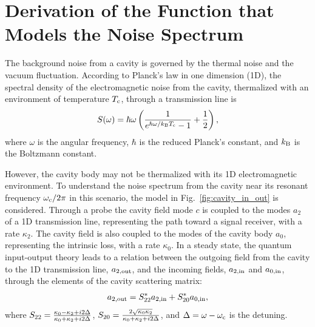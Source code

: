 \section{Derivation of the Function that Models the Noise Spectrum} 
\label{sec:cavitynoise}

The background noise from a cavity is governed by the thermal noise and the 
vacuum fluctuation. %
According to Planck's law in one dimension (1D), the spectral density of 
the electromagnetic noise from the cavity, thermalized with an environment of 
temperature $T_{\rm c}$, through a transmission line is 
\begin{equation}
\label{eq:cavity_thermal_spectral_density}
    S(\omega) = \hbar\omega \left( \frac{1}{e^{\hbar\omega/k_{\rm B}T_{\rm c}} - 1} +\frac{1}{2} \right),
\end{equation}
where $\omega$ is the angular frequency, $\hbar$ is the reduced Planck's 
constant, and $k_{\rm B}$ is the Boltzmann constant. 

However, the cavity body may not be thermalized with its 1D electromagnetic 
environment. To understand the noise spectrum from the cavity near its 
resonant frequency $\omega_{\rm c}/2\pi$ in this scenario, the model in 
Fig.~\ref{fig:cavity_in_out} is considered. Through a probe the cavity field 
mode $c$ is coupled to the modes $a_2$ of a 1D transmission line, representing
 the path toward a signal receiver, with a rate $\kappa_2$. The cavity field 
is also coupled to the modes of the cavity body $a_0$, representing the 
intrinsic loss, with a rate $\kappa_0$. In a steady state, 
the quantum input-output theory leads to a relation between the outgoing field 
from the cavity to the 1D transmission line, $a_{\rm 2,out}$, and the incoming
 fields, $a_{\rm 2,in}$ and $a_{\rm 0,in}$, through the elements of the 
cavity scattering matrix:
\begin{equation} \label{eq:outgoing_field}
	 a_{\rm 2,out} = S^{*}_{\rm 22} a_{\rm 2,in} + S^{*}_{\rm 20} a_{\rm 0,in},
\end{equation}
where $S_{\rm 22} = \frac {\kappa_0 - \kappa_{\rm 2} + i 2 \Delta} {\kappa_0+\kappa_{\rm 2} + i 2 \Delta}$, $S_{\rm 20} = \frac {2\sqrt{\kappa_0 \kappa_{\rm 2}}} {\kappa_0+\kappa_{\rm 2} + i 2 \Delta}$,
and $\Delta = \omega-\omega_{\rm c}$ is the detuning. 

